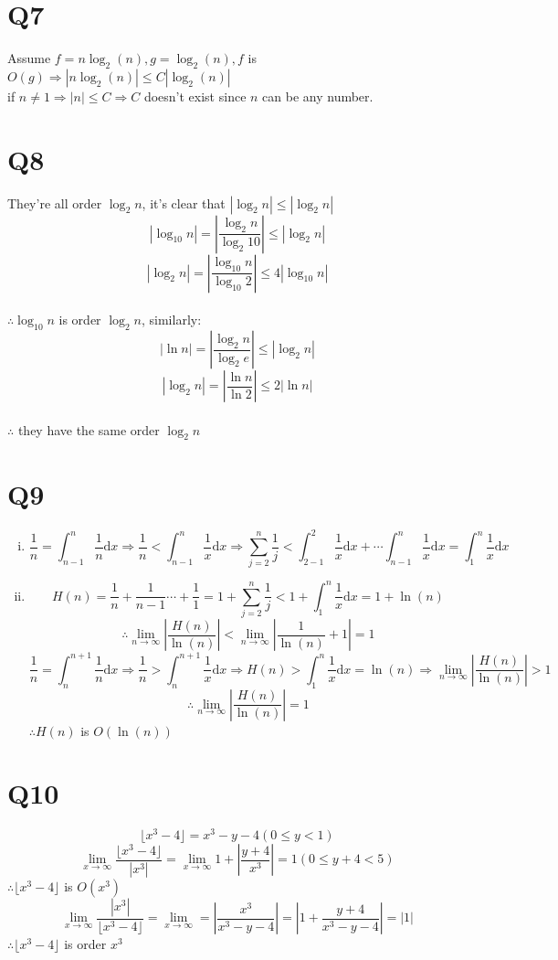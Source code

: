 \documentclass[12pt]{article}
\begin{document}
\section{Q7}
Assume $f=n\log_2(n),g=\log_2(n),f$ is $O(g)\Rightarrow |n\log_2(n)|\leq C|\log_2(n)|$
\\if $n\neq 1\Rightarrow |n|\leq C\Rightarrow C$ doesn't exist since $n$ can be any number.
\section{Q8}
They're all order $\log_2{n}$, it's clear that $|\log_2{n}|\leq|\log_2{n}|$
$$|\log_{10}{n}|=|\frac{\log_2{n}}{\log_{2}{10}}|\leq|\log_2{n}|$$
$$|\log_2n|=|\frac{\log_{10}n}{\log_{10}2}|\leq4|\log_{10}n|$$
\\$\therefore \log_{10}n$ is order $\log_2n$, similarly:
$$|\ln{n}|=|\frac{\log_2{n}}{\log_2{e}}|\leq|\log_2{n}|$$
$$|\log_2n|=|\frac{\ln n}{\ln2}|\leq2|\ln n|$$
\\$\therefore$ they have the same order $\log_2{n}$
\section{Q9}
\begin{enumerate}[(i)]
\item 
$$\frac{1}{n}=\int_{n-1}^n\frac{1}{n}\mathrm{d}x\Rightarrow\frac{1}{n}<\int_{n-1}^n\frac{1}{x}\mathrm{d}x\Rightarrow\sum_{j=2}^n\frac{1}{j}<\int_{2-1}^2\frac{1}{x}\mathrm{d}x+\cdots\int_{n-1}^n\frac{1}{x}\mathrm{d}x=\int_1^n\frac{1}{x}\mathrm{d}x$$ 
\item 
$$H(n)=\frac{1}{n}+\frac{1}{n-1}\cdots+\frac{1}{1}=1+\sum_{j=2}^n\frac{1}{j}<1+\int_1^n\frac{1}{x}\mathrm{d}x=1+\ln(n)$$
$$\therefore\lim_{n\to\infty}|\frac{H(n)}{\ln(n)}|<\lim_{n\to\infty}|\frac{1}{\ln(n)}+1|=1$$
$$\frac{1}{n}=\int_n^{n+1}\frac{1}{n}\mathrm{d}x\Rightarrow\frac{1}{n}>\int_n^{n+1}\frac{1}{x}\mathrm{d}x\Rightarrow H(n)>\int_1^n\frac{1}{x}\mathrm{d}x=\ln(n)\Rightarrow\lim_{n\to\infty}|\frac{H(n)}{\ln(n)}|>1$$
$$\therefore\lim_{n\to\infty}|\frac{H(n)}{\ln(n)}|=1$$
$\therefore H(n)$ is $O(\ln(n))$
\end{enumerate}
\section{Q10}
$$\lfloor x^3-4\rfloor=x^3-y-4(0\leq y<1)$$
$$\lim_{x\to\infty}\frac{\lfloor x^3-4\rfloor}{|x^3|}=\lim_{x\to\infty}1+|\frac{y+4}{x^3}|=1(0\leq y+4<5)$$
$\therefore\lfloor x^3-4\rfloor$ is $O(x^3)$
$$\lim_{x\to\infty}\frac{|x^3|}{\lfloor x^3-4\rfloor}=\lim_{x\to\infty}=|\frac{x^3}{x^3-y-4}|=|1+\frac{y+4}{x^3-y-4}|=|1|$$
$\therefore\lfloor x^3-4\rfloor$ is order $x^3$
\end{document}
